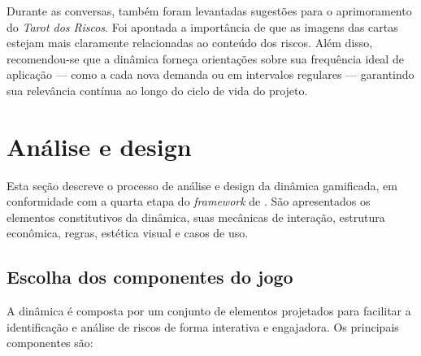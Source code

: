 \documentclass[
	12pt,
	openright,
	twoside,
	a4paper,
	english,
	brazil
	]{abntex2}
\begin{document}
Durante as conversas, também foram levantadas sugestões para o aprimoramento do \textit{Tarot dos Riscos}. Foi apontada a importância de que as imagens das cartas estejam mais claramente relacionadas ao conteúdo dos riscos. Além disso, recomendou-se que a dinâmica forneça orientações sobre sua frequência ideal de aplicação — como a cada nova demanda ou em intervalos regulares — garantindo sua relevância contínua ao longo do ciclo de vida do projeto.

\section{Análise e design}
\label{sec:analise-design}

Esta seção descreve o processo de análise e design da dinâmica gamificada, em conformidade com a quarta etapa do \textit{framework} de . São apresentados os elementos constitutivos da dinâmica, suas mecânicas de interação, estrutura econômica, regras, estética visual e casos de uso. 

\subsection{Escolha dos componentes do jogo}
\label{sec:escolha-componentes}

A dinâmica é composta por um conjunto de elementos projetados para facilitar a identificação e análise de riscos de forma interativa e engajadora. Os principais componentes são:
\end{document}

